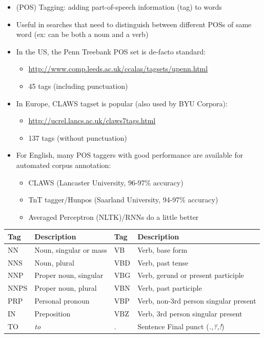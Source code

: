 \documentclass[a4paper,landscape,headrule,footrule,dvips]{foils}
\begin{document}
\begin{CJK}{UTF8}{min}

\begin{itemize}
\item  (POS) Tagging: adding part-of-speech information (tag) to words
\item  Useful in searches that need to distinguish between different POSs of same word
(ex:  can be both a noun and a verb)
\item  In the US, the Penn Treebank POS set is de-facto standard:
  \begin{itemize}
  \item  \url{http://www.comp.leeds.ac.uk/ccalas/tagsets/upenn.html}
  \item 45 tags (including punctuation)
  \end{itemize}
\item  In Europe, CLAWS tagset is popular (also used by BYU Corpora):
  \begin{itemize}
  \item   \url{http://ucrel.lancs.ac.uk/claws7tags.html}
  \item 137 tags (without punctuation)
  \end{itemize}
\item  For English, many POS taggers with good performance are available for
  automated corpus annotation:
  \begin{itemize}
  \item  CLAWS (Lancaster University, 96-97\% accuracy)%
  \item  TnT tagger/Hunpos (Saarland University, 94-97\% accuracy)
  \item  Averaged Perceptron (NLTK)/RNNs do a little better
  \end{itemize}
\end{itemize}



\noindent\begin{tabular}{llll}
  Tag & Description  &   Tag & Description \\
\hline
NN   & Noun, singular or mass  & VB   & Verb, base form    \\                   
NNS  & Noun, plural            & VBD  & Verb, past tense    \\                  
NNP  & Proper noun, singular   & VBG  & Verb, gerund or present participle  \\  
NNPS & Proper noun, plural     & VBN  & Verb, past participle               \\  
PRP  & Personal pronoun        & VBP  & Verb, non-3rd person singular present \\
IN   & Preposition             & VBZ  & Verb, 3rd person singular present     \\
TO   & \textit{to}             & .    & Sentence Final punct (\textit{.,?,!})
\end{tabular}


\end{CJK}
\end{document}

